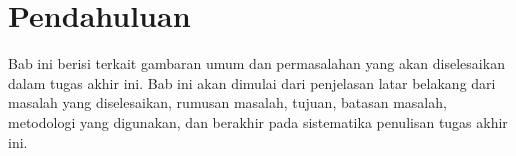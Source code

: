 \chapter{Pendahuluan}

Bab ini berisi terkait gambaran umum dan permasalahan yang akan diselesaikan dalam tugas akhir ini. Bab ini akan dimulai dari penjelasan latar belakang dari masalah yang diselesaikan, rumusan masalah, tujuan, batasan masalah, metodologi yang digunakan, dan berakhir pada sistematika penulisan tugas akhir ini.











